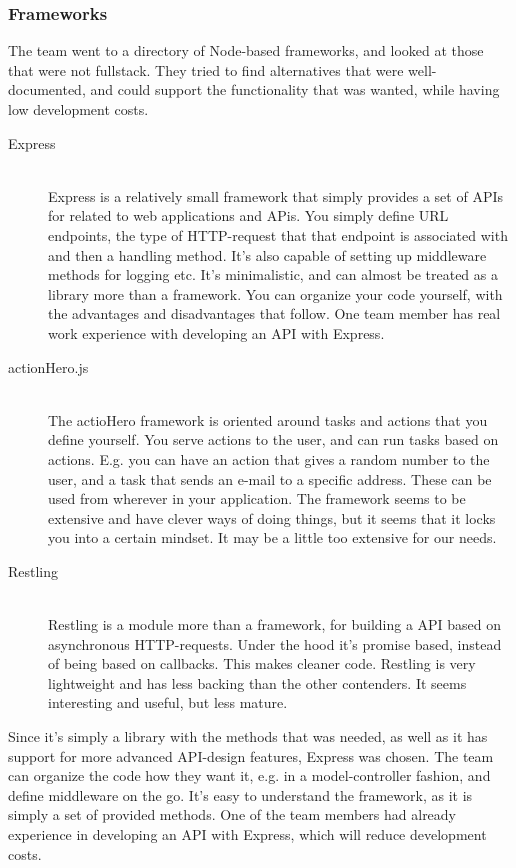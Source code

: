 \subsubsection{Frameworks}

The team went to a directory of Node-based frameworks,\cite{node-frameworks-directory} and looked at those that were not fullstack. They tried to find alternatives that were well-documented, and could support the functionality that was wanted, while having low development costs. 

\begin{description}
    \item[Express] \hfill \\
        Express is a relatively small framework that simply provides a set of APIs for related to web applications and APis.\cite{express} You simply define URL endpoints, the type of HTTP-request that that endpoint is associated with and then a handling method. It's also capable of setting up middleware methods for logging etc. It's minimalistic, and can almost be treated as a library more than a framework. You can organize your code yourself, with the advantages and disadvantages that follow. One team member has real work experience with developing an API with Express.
    \item[actionHero.js] \hfill \\
        The actioHero framework is oriented around tasks and actions that you define yourself. You serve actions to the user, and can run tasks based on actions.\cite{actionhero} E.g. you can have an action that gives a random number to the user, and a task that sends an e-mail to a specific address. These can be used from wherever in your application. The framework seems to be extensive and have clever ways of doing things, but it seems that it locks you into a certain mindset. It may be a little too extensive for our needs.
    \item[Restling] \hfill \\
        Restling is a module more than a framework, for building a API based on asynchronous HTTP-requests. Under the hood it's promise based, instead of being based on callbacks. This makes cleaner code. Restling is very lightweight and has less backing than the other contenders. It seems interesting and useful, but less mature.\cite{restling} 
\end{description}

Since it's simply a library with the methods that was needed, as well as it has support for more advanced API-design features, Express was chosen. The team can organize the code how they want it, e.g. in a model-controller fashion, and define middleware on the go. It's easy to understand the framework, as it is simply a set of provided methods. One of the team members had already experience in developing an API with Express, which will reduce development costs.

